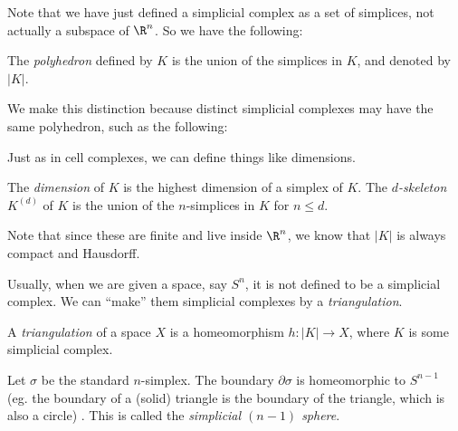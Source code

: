 \documentclass[a4paper]{article}
\begin{document}
Note that we have just defined a simplicial complex as a set of simplices, not actually a subspace of $\R^n$. So we have the following:
\begin{defi}[Polyhedron]
  The \emph{polyhedron} defined by $K$ is the union of the simplices in $K$, and denoted by $|K|$.
\end{defi}
We make this distinction because distinct simplicial complexes may have the same polyhedron, such as the following:
\begin{center}
\end{center}
Just as in cell complexes, we can define things like dimensions.
\begin{defi}
  The \emph{dimension} of $K$ is the highest dimension of a simplex of $K$. The \emph{$d$-skeleton} $K^{(d)}$ of $K$ is the union of the $n$-simplices in $K$ for $n \leq d$.
\end{defi}
Note that since these are finite and live inside $\R^n$, we know that $|K|$ is always compact and Hausdorff.

Usually, when we are given a space, say $S^n$, it is not defined to be a simplicial complex. We can ``make'' them simplicial complexes by a \emph{triangulation}.
\begin{defi}[Triangulation]
  A \emph{triangulation} of a space $X$ is a homeomorphism $h: |K| \to X$, where $K$ is some simplicial complex.
\end{defi}

\begin{eg}
  Let $\sigma$ be the standard $n$-simplex. The boundary $\partial \sigma$ is homeomorphic to $S^{n - 1}$ (eg. the boundary of a (solid) triangle is the boundary of the triangle, which is also a circle) . This is called the \emph{simplicial $(n - 1)$ sphere}.
\end{eg}
\end{document}
